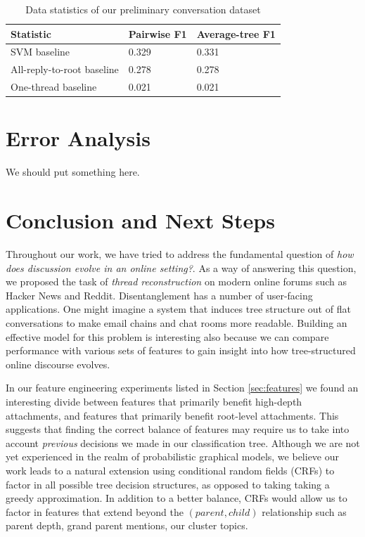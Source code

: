 \documentclass{article}
\begin{document}
\begin{table}[h]\footnotesize
 \begin{tabular}{| l | l | l |} 
   \hline
   \textbf{Statistic} & Pairwise F1 & Average-tree F1 \\
   \hline
    SVM baseline & 0.329 & 0.331 \\
    All-reply-to-root baseline & 0.278 & 0.278 \\
    One-thread baseline & 0.021 & 0.021 \\
   \hline
  \end{tabular}
  \caption{Data statistics of our preliminary conversation dataset}
  \label{table:results}
\end{table}

\section{Error Analysis}
We should put something here.

\section{Conclusion and Next Steps}
Throughout our work, we have tried to address the fundamental question of
\textit{how does discussion evolve in an online setting?}. As a way of answering
this question, we proposed the task of \textit{thread reconstruction} on modern
online forums such as Hacker News and Reddit. Disentanglement has a number of
user-facing applications. One might imagine a system that induces tree structure
out of flat conversations to make email chains and chat rooms more readable.
Building an effective model for this problem is interesting also because we can
compare performance with various sets of features to gain insight into how 
tree-structured online discourse evolves.

In our feature engineering experiments listed in Section \ref{sec:features} we
found an interesting divide between features that primarily benefit high-depth
attachments, and features that primarily benefit root-level attachments. This
suggests that finding the correct balance of features may require us to take into
account \textit{previous} decisions we made in our classification tree. Although
we are not yet experienced in the realm of probabilistic graphical models, we
believe our work leads to a natural extension using conditional random fields
(CRFs) to factor in all possible tree decision structures, as opposed to taking
taking a greedy approximation. In addition to a better balance, CRFs
would allow us to factor in features that extend beyond the $(parent,child)$
relationship such as parent depth, grand parent mentions, our cluster topics. 
\end{document}
